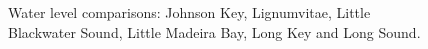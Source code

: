 \begin{figure}[H]
  \caption{Water level comparisons: Johnson Key, Lignumvitae, Little Blackwater Sound, Little Madeira Bay, Long Key and Long Sound.}
  \label{fig:Stage compare 2}
\end{figure}

